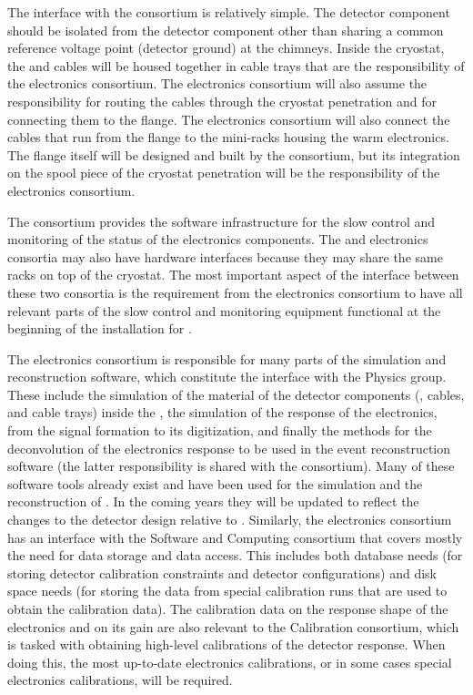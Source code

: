 The interface with the  consortium is relatively simple.
The  detector component should be isolated from the 
detector component other than sharing a common reference 
voltage point (detector ground) at the chimneys. Inside the cryostat, the 
 and  cables will be housed together in
cable trays that are the responsibility of the  electronics
consortium. The  electronics consortium will also assume
the responsibility for routing the  cables through the
cryostat penetration and for connecting them to the 
flange. The  electronics consortium will also connect
the cables that run from the flange
to the mini-racks housing the  warm electronics. 
The flange itself will be designed and built by the 
consortium, but its integration on the spool piece
of the cryostat penetration will be the responsibility of the  electronics
consortium.

The  consortium provides the software infrastructure for the slow
control and monitoring of the status of the  electronics components.
The  and  electronics consortia may also have hardware
interfaces because they may share the same racks on top of the
cryostat. The most important aspect of the interface between these
two consortia is the requirement from the  electronics consortium
to have all relevant parts of the slow control and monitoring
equipment functional at the beginning
of the installation for . 

The  electronics consortium is responsible for many parts of
the  simulation and reconstruction software, which constitute
the interface with the Physics group. These include the
simulation of the material of the detector components (, cables, and
cable trays) inside the , the simulation
of the response of the electronics, from the signal formation to its 
digitization, and finally the methods for the deconvolution of the electronics
response to be used in the event reconstruction software (the latter responsibility is shared 
with the  consortium). Many of these
software tools  already exist and have been used for the simulation
and the reconstruction of . In the coming years they will be
updated to reflect the changes to the detector design relative to 
. Similarly, the 
electronics consortium has an interface with the Software and Computing
consortium that covers mostly the need for data storage and data access.
This includes both database needs (for storing detector calibration constraints
and detector configurations) and disk space needs (for storing the data 
from special calibration runs that are used to obtain the calibration
data). The calibration data on the response shape of the electronics and
on its gain are also relevant to the Calibration consortium,
which is tasked with obtaining high-level calibrations of the detector
response. When doing this, the most up-to-date electronics calibrations,
or in some cases special electronics calibrations, will be required.
